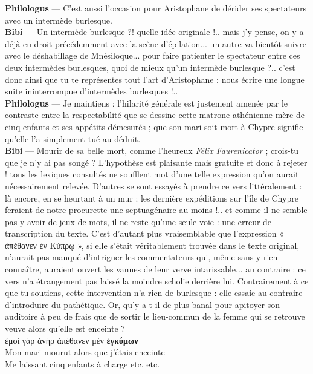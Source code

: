 \documentclass{book}%
\newcommand{\italique}[1]{\textit{#1}}%
\newcommand{\espace}[1]{\hspace{#1}}%
\newlength{\larg}%
\newcommand{\decalageN}[1]{%
\settowidth{\larg}{#1}%
\espace{-\larg}%
}
\newcommand{\perso}[1]{\decalageN{\textbf{#1} --- }\textbf{#1}}%
\begin{document}
\perso{Philologus} — C'est aussi l'occasion pour Aristophane de dérider ses spectateurs avec un intermède burlesque. \\

\perso{Bibi} — Un intermède burlesque ?! quelle idée originale !.. mais j'y pense, on y a déjà eu droit précédemment avec la scène d'épilation... un autre va bientôt suivre avec le déshabillage de Mnésiloque... pour faire patienter le spectateur entre ces deux intermèdes burlesques, quoi de mieux qu'un intermède burlesque ?.. c'est donc ainsi que tu te représentes tout l'art d'Aristophane : nous écrire une longue suite ininterrompue d'intermèdes burlesques !.. \\

\perso{Philologus} — Je maintiens : l'hilarité générale est justement amenée par le contraste entre la respectabilité que se dessine cette matrone athénienne mère de cinq enfants et ses appétits démesurés ; que son mari soit mort à Chypre signifie qu'elle l'a simplement tué au déduit. \\

\perso{Bibi} — Mourir de sa belle mort, comme l'heureux \italique{Félix Faurenicator} ; crois-tu que je n'y ai pas songé ? L'hypothèse est plaisante mais gratuite et donc à rejeter ! tous les lexiques consultés ne soufflent mot d'une telle expression qu'on aurait nécessairement relevée. D'autres se sont essayés à prendre ce vers littéralement : là encore, en se heurtant à un mur : les dernière expéditions sur l'île de Chypre feraient de notre procurette une septuagénaire au moins !.. et comme il ne semble pas y avoir de jeux de mots, il ne reste qu'une seule voie : une erreur de transcription du texte. C'est d'autant plus vraisemblable que l'expression « ἀπέθανεν ἐν Κύπρῳ », si elle s'était véritablement trouvée dans le texte original, n'aurait pas manqué d'intriguer les commentateurs qui, même sans y rien connaître, auraient ouvert les vannes de leur verve intarissable... au contraire : ce vers n'a étrangement pas laissé la moindre scholie derrière lui. Contrairement à ce que tu soutiens, cette intervention n'a rien de burlesque : elle essaie au contraire d'introduire du pathétique. Or, qu'y a-t-il de plus banal pour apitoyer son auditoire à peu de frais que de sortir le lieu-commun de la femme qui se retrouve veuve alors qu'elle est enceinte ? \\
ἐμοὶ γὰρ ἁνὴρ ἀπέθανεν μὲν \textbf{ἐγκύμων} \\
Mon mari mourut alors que j'étais enceinte \\
Me laissant cinq enfants à charge etc. etc. \\
\end{document}
